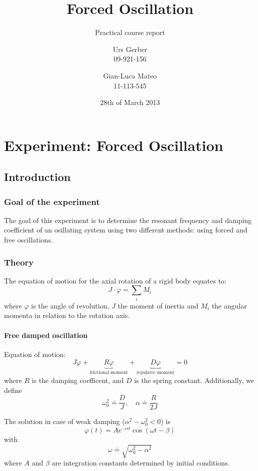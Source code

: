 \documentclass{scrreprt}
\author{Urs Gerber\\09-921-156 \and Gian-Luca Mateo\\11-113-545}
\date{28th of March 2013}
\title{Forced Oscillation}
\subtitle{Practical course report}
\renewcommand{\phi}{\varphi}
\begin{document}
\maketitle

\tableofcontents
\newpage

\chapter{Experiment: Forced Oscillation}
\section{Introduction}
\subsection{Goal of the experiment}
The goal of this experiment is to determine the resonant frequency and damping coefficient of an osillating system using two different methods: using forced and free oscillations.

\subsection{Theory}
The equation of motion for the axial rotation of a rigid body equates to:
\begin{equation}
J\cdot \ddot{\phi} = \sum_i M_i
\end{equation}
where $\phi$ is the angle of revolution, $J$ the moment of inertia and $M_i$ the angular momenta in relation to the rotation axis.

\subsubsection{Free damped oscillation}
Equation of motion:
\begin{equation}
J\ddot{\phi} + \underbrace{R \dot{\phi}}_{\text{frictional moment}} + \underbrace{D \phi}_{\text{repulsive moment}} = 0
\end{equation}
where $R$ is the damping coefficent, and $D$ is the spring constant. Additionally, we define
\begin{equation}
\omega_0^2 \doteq \frac{D}{J}, \quad \alpha \doteq \frac{R}{2J}
\end{equation}

The solution in case of weak damping ($\alpha^2 - \omega_0^2 < 0$) is
\begin{equation}
\phi(t) = A e^{-\alpha t} \cos{\left(\omega t - \beta\right)} \label{eq:freedampedsolution}
\end{equation}
with
\begin{equation} 
\omega \doteq \sqrt{\omega_0^2-\alpha^2}
\label{omega0}
\end{equation}
where $A$ and $\beta$ are integration constants determined by initial conditions. 
\end{document}
